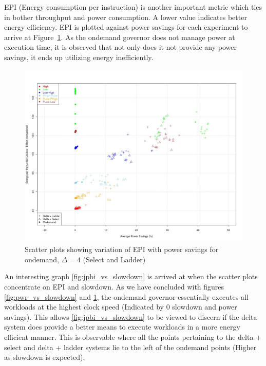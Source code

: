 EPI (Energy consumption per instruction) is another important metric which ties in bother throughput and power
consumption. A lower value indicates better energy efficiency. EPI is plotted 
against power savings for each experiment to arrive at Figure~\ref{fig:pwr_vs_jpbi}. As the ondemand governor
does not manage power at execution time, it is observed that not only does it not provide any power savings, 
it ends up utilizing energy inefficiently. 

\begin{figure}[h!]
  \begin{center}
    \includegraphics[height=3.5in]{figures/pwr_vs_jpbi_delta_4.jpg}%
    \caption{Scatter plots showing variation of EPI with power savings for ondemand, $\Delta=4$ (Select and Ladder)}
    \label{fig:pwr_vs_jpbi}
  \end{center}
\end{figure}


An interesting graph \ref{fig:jpbi_vs_slowdown} is arrived at when the scatter plots concentrate on
EPI and slowdown. As we have concluded with figures \ref{fig:pwr_vs_slowdown} and \ref{fig:pwr_vs_jpbi},
the ondemand governor essentially executes all workloads at the highest clock speed (Indicated by 0 slowdown 
and power savings). This allows \ref{fig:jpbi_vs_slowdown} to be viewed to discern if the delta system
does provide a better means to execute workloads in a more energy efficient manner. This is observable
where all the points pertaining to the delta + select and delta + ladder systems lie to the left of 
the ondemand points (Higher as slowdown is expected). 

